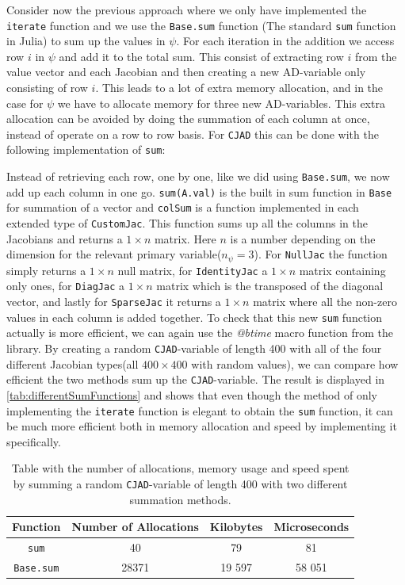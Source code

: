 Consider now the previous approach where we only have implemented the \texttt{iterate} function and we use the \texttt{Base.sum} function (The standard \texttt{sum} function in Julia) to sum up the values in $\psi$. For each iteration in the addition we access row $i$ in $\psi$ and add it to the total sum. This consist of extracting row $i$ from the value vector and each Jacobian and then creating a new AD-variable only consisting of row $i$. This leads to a lot of extra memory allocation, and in the case for $\psi$ we have to allocate memory for three new AD-variables. This extra allocation can be avoided by doing the summation of each column at once, instead of operate on a row to row basis. For \texttt{CJAD} this can be done with the following implementation of \texttt{sum}:

Instead of retrieving each row, one by one, like we did using \texttt{Base.sum}, we now add up each column in one go. \texttt{sum(A.val)} is the built in sum function in \texttt{Base} for summation of a vector and \texttt{colSum} is a function implemented in each extended type of \texttt{CustomJac}. This function sums up all the columns in the Jacobians and returns a $1\times n$ matrix. Here $n$ is a number depending on the dimension for the relevant primary variable($n_\psi = 3$). For \texttt{NullJac} the function simply returns a $1\times n$ null matrix, for \texttt{IdentityJac} a $1\times n$ matrix containing only ones, for \texttt{DiagJac} a $1\times n$ matrix which is the transposed of the diagonal vector, and lastly for \texttt{SparseJac} it returns a $1\times n$ matrix where all the non-zero values in each column is added together. To check that this new \texttt{sum} function actually is more efficient, we can again use the \textit{@btime} macro function from the \emph{\cite{BenchmarkTools}} library. By creating a random \texttt{CJAD}-variable of length 400 with all of the four different Jacobian types(all $400\times 400$ with random values), we can compare how efficient the two methods sum up the \texttt{CJAD}-variable. The result is displayed in \autoref{tab:differentSumFunctions} and shows that even though the method of only implementing the \texttt{iterate} function is elegant to obtain the \texttt{sum} function, it can be much more efficient both in memory allocation and speed by implementing it specifically.

\begin{table}[H]
    \centering
    \caption{Table with the number of allocations, memory usage and speed spent by summing a random \texttt{CJAD}-variable of length 400 with two different summation methods.}
    \label{tab:differentSumFunctions}
    \def\arraystretch{1.5}
    \begin{tabular}{cccc}
    \textbf{Function} & \textbf{Number of Allocations} & \textbf{Kilobytes} & \textbf{Microseconds} \\
        \hline
         \texttt{sum} & 40 & 79 & 81 \\  
         \texttt{Base.sum} & 28371 & 19 597 & 58 051\\ 
         \hline
    \end{tabular}
\end{table}

